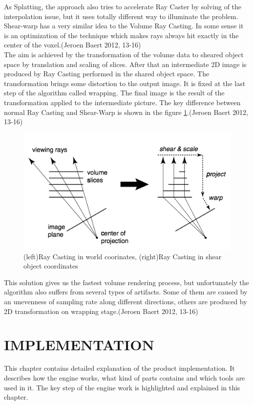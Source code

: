 \documentclass[twoside, english, 11pt]{report}
\begin{document}
As Splatting, the approach also tries to accelerate Ray Caster by solving of the interpolation issue, but it uses totally different way to illuminate the problem. Shear-warp has a very similar idea to the Volume Ray Casting. In some sense it is an optimization of the technique which makes rays always hit exactly in the center of the voxel.(Jeroen Baert 2012, 13-16)\\

The aim is achieved by the transformation of the volume data to sheared object space by translation and scaling of slices. After that an intermediate 2D image is produced by Ray Casting performed in the shared object space. The transformation brings some distortion to the output image. It is fixed at the last step of the algorithm called wrapping. The final image is the result of the transformation applied to the intermediate picture. The key difference between normal Ray Casting and Shear-Warp is shown in the figure \ref{fig:sw}.(Jeroen Baert 2012, 13-16)\\
\begin{figure}[!h]
\centerline{\includegraphics[scale=0.5]{img/shear-warp}}
\caption{(left)Ray Casting in world coorinates, (right)Ray Casting in shear object coordinates\label{fig:sw}}
\end{figure}
This solution gives us the fastest volume rendering process, but unfortunately the algorithm also suffers from several types of artifacts. Some of them are caused by an unevenness of sampling rate along different directions, others are produced by 2D transformation on wrapping stage.(Jeroen Baert 2012, 13-16)\\

\chapter{IMPLEMENTATION}
This chapter contains detailed explanation of the product implementation. It describes how the engine works, what kind of parts contains and which tools are used in it. The key step of the engine work is highlighted and explained in this chapter.\\
\end{document}
